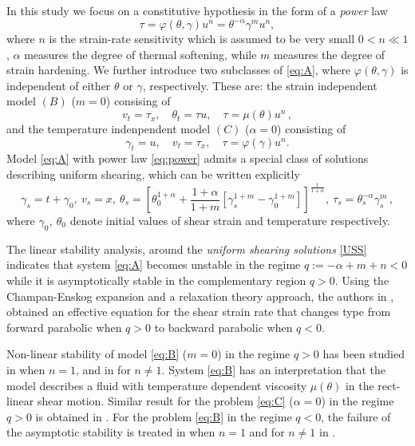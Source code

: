 \documentclass[graybox]{svmult}
\begin{document}
In this study we focus on a constitutive hypothesis in the form of a \emph{power} law 
\begin{equation}
 \tau = \varphi(\theta,\gamma)u^n = \theta^{-\alpha}\gamma^m u^n, \label{eq:power} 
\end{equation}
where $n$ is the strain-rate sensitivity which is assumed to be very small $0<n\ll1$, $\alpha$ measures the degree of thermal softening, while $m$ measures the degree of strain hardening. We further introduce two subclasses of \eqref{eq:A}, where $\varphi (\theta, \gamma)$ is independent 
of either $\theta$ or $\gamma$, respectively. These are: the strain independent model $(B)$ ($m = 0$)  consising of 
\begin{equation} \label{eq:B}\tag{B}
 v_t = \tau_x, \quad \theta_t = \tau u, \quad \tau = \mu(\theta)u^n 	\, , 	
\end{equation}
and the temperature indenpendent model $(C)$ ($\alpha = 0$) consisting of
\begin{equation} \label{eq:C}\tag{C}
 \gamma_t = u, \quad  v_t = \tau_x, \quad \tau = \varphi(\gamma)u^n.			
\end{equation}
Model \eqref{eq:A} with power law \eqref{eq:power} admits a special class of solutions describing uniform shearing,  which can be written explicitly 
\begin{equation}
\label{USS}
 \gamma_s = t+\gamma_0, \ v_s=x, \ \theta_s=\left[\theta_0^{1+\alpha}+\frac{1+\alpha}{1+m}\left[ \gamma_s^{1+m} - \gamma_0^{1+m}\right] \right]^{\frac1{1+\alpha}}, \  \tau_s = \theta_s^{-\alpha}\gamma_s^m \, ,
\end{equation}
where $\gamma_0, \ \theta_0$ denote  initial values of shear strain and temperature respectively. 

The linear stability analysis, \cite{FM87} around the \emph{uniform shearing solutions} \eqref{USS} indicates that system \eqref{eq:A} becomes unstable in the regime 
$q:=-\alpha + m + n < 0$ while it is asymptotically stable in the complementary region $q > 0$. Using the Champan-Enskog expansion and a relaxation theory approach, the authors in \cite{KT09}, obtained an effective equation for the shear strain rate that changes type from forward parabolic when $q>0$ to backward parabolic when $q<0$. 

Non-linear stability of model \eqref{eq:B} ($m=0$) in the regime $q>0$ has been studied in \cite{dafermos_adiabatic_1983} when $n=1$, and in \cite{Tz_1986} for $n\ne1$. System \eqref{eq:B} has an interpretation that the model describes a fluid with temperature dependent viscosity $\mu(\theta)$ in the rect-linear shear motion. Similar result for the problem \eqref{eq:C} ($\alpha=0$) in the regime $q>0$  is obtained in \cite{tzavaras_nonlinear_1992}. For the problem \eqref{eq:B} in the regime $q<0$, the failure of the asymptotic stability is treated in \cite{bertsch_effect_1991} when $n=1$ and for $n\ne1$ in \cite{KT09}.  
\end{document}
